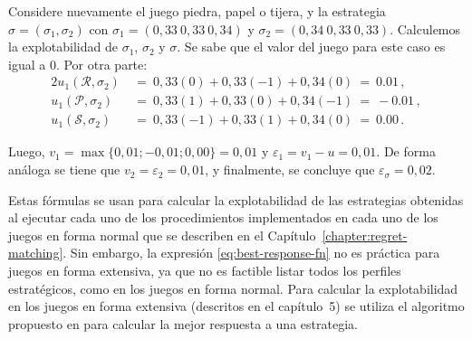 Considere nuevamente el juego piedra, papel o tijera, y la estrategia $\sigma = (\sigma_1, \sigma_2)$ con $\sigma_1 = (0,33\ 0,33\ 0,34)$ y $\sigma_2 = (0,34\ 0,33\ 0,33)$. Calculemos la explotabilidad de $\sigma_1$, $\sigma_2$ y $\sigma$. Se sabe que el valor del juego para este caso es igual a $0$. Por otra parte:
\begin{alignat}{2}
u_1(\mathcal{R}, \sigma_2)\ &=\ 0,33(0)  +  0,33(-1) +  0,34(0)\  =\  0.01 \,, \\
u_1(\mathcal{P}, \sigma_2)\ &=\ 0,33(1)  +   0,33(0) +  0,34(-1)\ =\ -0.01 \,, \\
u_1(\mathcal{S}, \sigma_2)\ &=\ 0,33(-1) +   0,33(1) +  0,34(0)\  =\  0.00 \,.
\end{alignat}

Luego, $v_1 = \max\{0,01; -0,01; 0,00\} = 0,01$ y $\varepsilon_1 = v_1 - u = 0,01$. De forma análoga se tiene que $v_2 = \varepsilon_2 = 0,01$, y finalmente, se concluye que $\varepsilon_{\sigma} = 0,02$.

Estas fórmulas se usan para calcular la explotabilidad de las estrategias obtenidas al ejecutar cada uno de los procedimientos implementados en cada uno de los juegos en forma normal que se describen en el Capítulo~\ref{chapter:regret-matching}. Sin embargo, la expresión \ref{eq:best-response-fn} no es práctica para juegos en forma extensiva, ya que no es factible listar todos los perfiles estratégicos, como en los juegos en forma normal. Para calcular la explotabilidad en los juegos en forma extensiva (descritos en el capítulo~5) se utiliza el algoritmo propuesto en \cite{bib:thesis-marc-lanctot} para calcular la mejor respuesta a una estrategia. 
